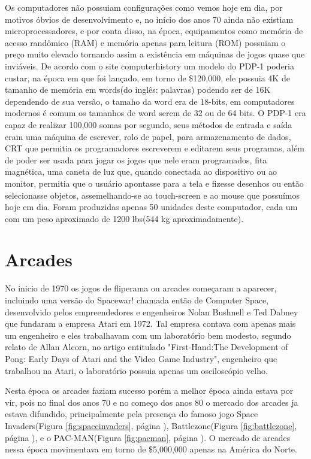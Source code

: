 \documentclass[12pt]{article}
\begin{document}
Os computadores não possuiam configurações como vemos hoje em dia, por motivos óbvios de desenvolvimento e, no início dos anos 70 ainda não existiam microprocessadores, e por conta disso, na época, equipamentos como memória de acesso randômico (RAM) e memória apenas para leitura (ROM) possuiam o preço muito elevado tornando assim a existência em máquinas de jogos quase que inviáveis. De acordo com o site computerhistory \nocite{pdp1} um modelo do PDP-1 poderia custar, na época em que foi lançado, em torno de \$120,000, ele possuia 4K de tamanho de memória em words(do inglês: palavras) podendo ser de 16K dependendo de sua vers\~{a}o, o tamaho da word era de 18-bits, em computadores modernos é comum os tamanhos de word serem de 32 ou de 64 bits. O PDP-1 era capaz de realizar 100,000 somas por segundo, seus métodos de entrada e saída eram uma máquina de escrever, rolo de papel, para armazenamento de dados, CRT que permitia os programadores escreverem e editarem seus programas, além de poder ser usada para jogar os jogos que nele eram programados, fita magnética, uma caneta de luz que, quando conectada ao dispositivo ou ao monitor, permitia que o usuário apontasse para a tela e fizesse desenhos ou ent\~{a}o selecionasse objetos, assemelhando-se ao touch-screen e ao mouse que possuímos hoje em dia. Foram produzidas apenas 50 unidades deste computador, cada um com um peso aproximado de 1200 lbs(544 kg aproximadamente).
\nocite{ram}
\section{Arcades}
No inicio de 1970 os jogos de fliperama ou arcades começaram a aparecer, incluindo uma vers\~{a}o do Spacewar! chamada ent\~{a}o de Computer Space, desenvolvido pelos empreendedores e engenheiros Nolan Bushnell e Ted Dabney que fundaram a empresa Atari em 1972. Tal empresa contava com apenas mais um engenheiro e eles trabalhavam com um laboratório bem modesto, segundo relato de Allan Alcorn, no artigo entitulado "First-Hand:The Development of Pong: Early Days of Atari and the Video Game Industry"\cite{allan}, engenheiro que trabalhou na Atari, o laboratório possuia apenas um osciloscópio velho.


Nesta época os arcades faziam sucesso porém a melhor época ainda estava por vir, pois no final dos anos 70 e no começo dos anos 80 o mercado dos arcades ja estava difundido, principalmente pela presença do famoso jogo Space Invaders(Figura \ref{fig:spaceinvaders}, página \pageref{fig:spaceinvaders}), Battlezone(Figura \ref{fig:battlezone}, página \pageref{fig:battlezone}), e o PAC-MAN(Figura \ref{fig:pacman}, página \pageref{fig:pacman}). O mercado de arcades nessa época movimentava em torno de \$5,000,000 apenas na América do Norte.
\end{document}
